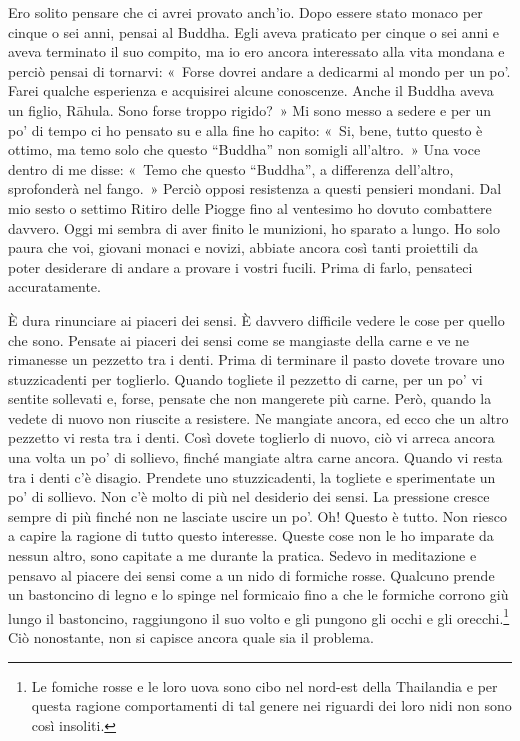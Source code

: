 Ero solito pensare che ci avrei provato anch'io. Dopo essere stato
monaco per cinque o sei anni, pensai al Buddha. Egli aveva praticato per
cinque o sei anni e aveva terminato il suo compito, ma io ero ancora
interessato alla vita mondana e perciò pensai di tornarvi: «~Forse
dovrei andare a dedicarmi al mondo per un po'. Farei qualche esperienza
e acquisirei alcune conoscenze. Anche il Buddha aveva un figlio, Rāhula.
Sono forse troppo rigido?~» Mi sono messo a sedere e per un po' di tempo
ci ho pensato su e alla fine ho capito: «~Si, bene, tutto questo è
ottimo, ma temo solo che questo ``Buddha'' non somigli all'altro.~» Una
voce dentro di me disse: «~Temo che questo ``Buddha'', a differenza
dell'altro, sprofonderà nel fango.~» Perciò opposi resistenza a questi
pensieri mondani. Dal mio sesto o settimo Ritiro delle Piogge fino al
ventesimo ho dovuto combattere davvero. Oggi mi sembra di aver finito le
munizioni, ho sparato a lungo. Ho solo paura che voi, giovani monaci e
novizi, abbiate ancora così tanti proiettili da poter desiderare di
andare a provare i vostri fucili. Prima di farlo, pensateci
accuratamente.

È dura rinunciare ai piaceri dei sensi. È davvero difficile vedere le
cose per quello che sono. Pensate ai piaceri dei sensi come se mangiaste
della carne e ve ne rimanesse un pezzetto tra i denti. Prima di
terminare il pasto dovete trovare uno stuzzicadenti per toglierlo.
Quando togliete il pezzetto di carne, per un po' vi sentite sollevati e,
forse, pensate che non mangerete più carne. Però, quando la vedete di
nuovo non riuscite a resistere. Ne mangiate ancora, ed ecco che un altro
pezzetto vi resta tra i denti. Così dovete toglierlo di nuovo, ciò vi
arreca ancora una volta un po' di sollievo, finché mangiate altra carne
ancora. Quando vi resta tra i denti c'è disagio. Prendete uno
stuzzicadenti, la togliete e sperimentate un po' di sollievo. Non c'è
molto di più nel desiderio dei sensi. La pressione cresce sempre di più
finché non ne lasciate uscire un po'. Oh! Questo è tutto. Non riesco a
capire la ragione di tutto questo interesse. Queste cose non le ho
imparate da nessun altro, sono capitate a me durante la pratica. Sedevo
in meditazione e pensavo al piacere dei sensi come a un nido di formiche
rosse. Qualcuno prende un bastoncino di legno e lo spinge nel formicaio
fino a che le formiche corrono giù lungo il bastoncino, raggiungono il
suo volto e gli pungono gli occhi e gli orecchi.\footnote{Le fomiche
  rosse e le loro uova sono cibo nel nord-est della Thailandia e per
  questa ragione comportamenti di tal genere nei riguardi dei loro nidi
  non sono così insoliti.} Ciò nonostante, non si capisce ancora quale
sia il problema.

